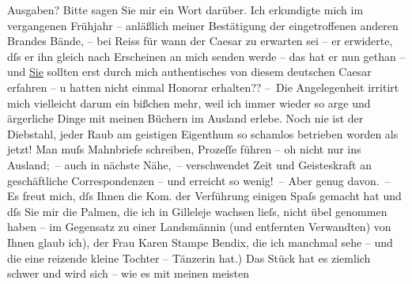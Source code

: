 \begin{ledgroupsized}[t]{13cm}
               Ausgaben? Bitte sagen Sie mir ein Wort darüber. Ich erkundigte mich im vergangenen
               Frühjahr – anläßlich meiner Bestätigung der eingetroffenen anderen Brandes Bände, –
                  \introOben{}bei Reiss\introOben{} für wann der Caesar zu erwarten sei – er
               erwiderte, dſs er ihn gleich nach Erscheinen an mich senden werde – das hat er {\pb}nun gethan – und \uline{Sie} sollten erst durch mich authentisches von diesem deutschen Caesar erfahren – u hatten nicht einmal Honorar
               erhalten??\pend
           \pstart
           – Die Angelegenheit irritirt mich vielleicht darum ein bißchen mehr, weil ich immer
               wieder so arge und ärgerliche Dinge mit meinen Büchern im Ausland erlebe. Noch nie
               ist der Diebstahl, jeder Raub am geistigen Eigenthum so schamlos betrieben worden als
               jetzt! Man muſs Mahnbriefe schreiben, Prozeſſe führen – oh nicht nur ins Ausland; –
               auch in nächste Nähe, – verschwendet Zeit und Geisteskraft an geschäftliche
               Correspondenzen – und erreicht so wenig! – Aber genug davon. –\pend
           \pstart
           Es freut mich, dſs Ihnen die Kom. der Verführung
               einigen Spaſs gemacht hat und dſs Sie mir die Palmen, die ich in Gilleleje wachsen {\pb}lieſs,
               nicht übel genommen haben – \label{T_L02423_1v}\label{T_L02423_1h}im
               Gegensatz zu einer Landsmännin (und entfernten Verwandten) von Ihnen glaub ich), der
               Frau Karen Stampe Bendix, die ich manchmal sehe –
               und die eine reizende kleine Tochter – Tänzerin hat.) Das Stück hat es ziemlich schwer und wird sich – wie es mit meinen meisten

\end{ledgroupsized}
